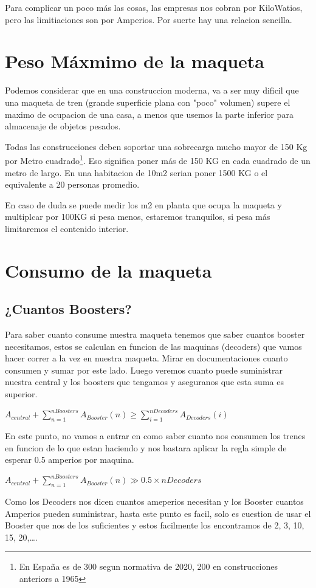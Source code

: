 Para complicar un poco más las cosas, las empresas nos cobran por KiloWatios, pero las limitiaciones son por Amperios. Por suerte hay una relacion sencilla.
\section{Peso Máxmimo de la maqueta}
Podemos considerar que en una construccion moderna, va a ser muy dificil que una maqueta de tren (grande superficie plana con "poco" volumen) supere el maximo de ocupacion de una casa, a menos que usemos la parte inferior para almacenaje de objetos pesados.

Todas las construcciones deben soportar una sobrecarga mucho mayor de 150 Kg por Metro cuadrado\footnote{En España es de 300 segun normativa de 2020, 200 en construcciones anteriors a 1965}. Eso significa poner más de 150 KG en cada cuadrado de un metro de largo. En una habitacion de 10m2 serian poner 1500 KG o el equivalente a 20 personas promedio. 

En caso de duda se puede medir los m2 en planta que ocupa la maqueta y multiplcar por 100KG si pesa menos, estaremos tranquilos, si pesa más limitaremos el contenido interior.

\section{Consumo de la maqueta}
\subsection{¿Cuantos Boosters?}
Para saber cuanto consume nuestra maqueta tenemos que saber cuantos booster necesitamos, estos se calculan en funcion de las maquinas (decoders) que vamos hacer correr a la vez en nuestra maqueta. Mirar en documentaciones cuanto consumen y sumar por este lado. Luego veremos cuanto puede suministrar nuestra central y los boosters que tengamos y aseguranos que esta suma es superior.

$A_{central} + \sum_{n=1}^{nBoosters}A_{Booster}(n) \geq \sum_{i=1}^{nDecoders}A_{Decoders}(i)$

En este punto, no vamos a entrar en como saber cuanto nos consumen los trenes en funcion de lo que estan haciendo y nos bastara aplicar la regla simple de esperar 0.5 amperios por maquina. 

$A_{central} + \sum_{n=1}^{nBoosters}A_{Booster}(n) \gg 0.5\times nDecoders $

Como los Decoders nos dicen cuantos ameperios necesitan y los Booster cuantos Amperios pueden suministrar, hasta este punto es facil, solo es cuestion de usar el Booster que nos de los suficientes y estos facilmente los encontramos de 2, 3, 10, 15, 20,\dots.
